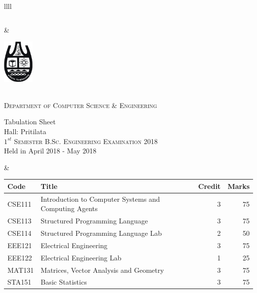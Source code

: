 \documentclass[11pt]{article}
\begin{document}
\begin{table}[ht]
\begin{tabularx}{\linewidth}{llll}
\begin{minipage}[m]{0.3\linewidth}
\begin{small}
{\begin{tabular}{ |c|}
			\end{tabular}
		}
	\end{small}
\end{minipage}

&
     \hspace{-5in}
\begin{minipage}[m]{0.35\textwidth} \centering
\includegraphics[width=0.6in]{cu-logo.jpg}
	
	\smallskip
	
	\\
	\textsc{Department of Computer Science \& Engineering}\\
	
	\smallskip
	
	{\large {\sc Tabulation Sheet}}\\
	{\large {\sc Hall: Pritilata}}\\
	
	\smallskip
	\textsc{$1^{st}$ Semester B.Sc. Engineering Examination 2018}\\
	{Held in April 2018 - May 2018}\\
\end{minipage}
&
\hspace{1cm}
\begin{minipage}[m]{0.3\linewidth} \flushright
	\hspace{-5cm}
	\begin{small}
		\renewcommand{\arraystretch}{1.01}
		\begin{tabular} {|l|l|r|r|}
			\hline \hline Code & Title  & Credit &  Marks \\ \hline
\hline  CSE111 & Introduction to Computer Systems and Computing Agents & 3 & 75  \\
\hline  CSE113 & Structured Programming Language & 3 & 75  \\
\hline  CSE114 & Structured Programming Language Lab & 2 & 50  \\
\hline  EEE121 & Electrical Engineering & 3 & 75  \\
\hline  EEE122 & Electrical Engineering Lab & 1 & 25  \\
\hline  MAT131 & Matrices, Vector Analysis and Geometry & 3 & 75  \\
\hline  STA151 & Basic Statistics & 3 & 75  \\
 \hline
		\end{tabular}
	\end{small} 
\end{minipage}


\end{tabularx}
\end{table}
\end{document}
